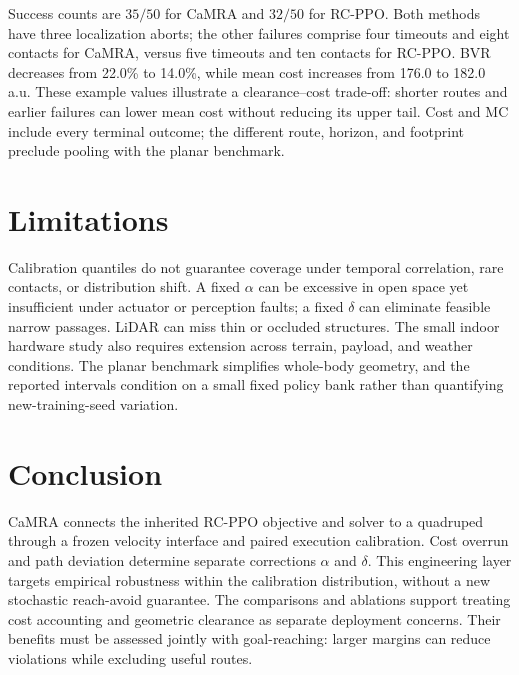\documentclass[conference]{IEEEtran}
\begin{document}
Success counts are $35/50$ for CaMRA and $32/50$ for RC-PPO. Both methods
have three localization aborts; the other failures comprise four timeouts and eight contacts
for CaMRA, versus five timeouts and ten contacts for RC-PPO. BVR decreases
from 22.0\% to 14.0\%, while mean cost increases from 176.0 to 182.0 a.u.
These example values illustrate a clearance--cost trade-off: shorter routes and
earlier failures can lower mean cost without reducing its upper tail.
Cost and MC include every terminal outcome; the different route, horizon, and
footprint preclude pooling with the planar benchmark.

\FloatBarrier

\section{Limitations}
Calibration quantiles do not guarantee
coverage under temporal correlation, rare contacts, or distribution shift.
A fixed $\alpha$ can be excessive in open space yet insufficient under actuator
or perception faults; a fixed $\delta$ can eliminate feasible narrow passages.
LiDAR can miss thin or occluded structures. The small indoor hardware study also
requires extension across terrain, payload, and weather conditions. The planar
benchmark simplifies whole-body geometry, and the reported intervals condition
on a small fixed policy bank rather than quantifying new-training-seed variation.

\section{Conclusion}
CaMRA connects the inherited RC-PPO objective and solver to a quadruped through
a frozen velocity interface and paired execution calibration. Cost overrun and
path deviation determine separate corrections $\alpha$ and $\delta$. This
engineering layer targets empirical robustness within the calibration distribution,
without a new stochastic reach-avoid guarantee. The comparisons and ablations
support treating cost accounting and geometric clearance as separate deployment
concerns. Their benefits must be assessed jointly with goal-reaching: larger
margins can reduce violations while excluding useful routes.




\clearpage
\appendices
\end{document}
